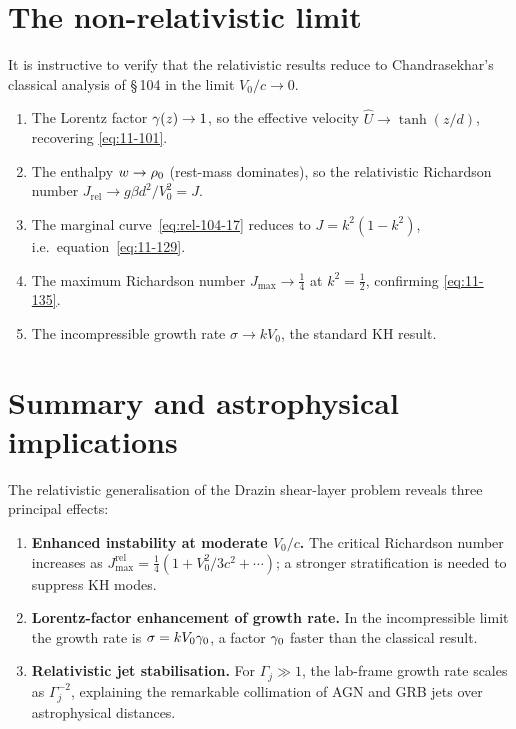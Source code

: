 \section{The non-relativistic limit}
\label{sec:rel-11-104-NR}

It is instructive to verify that the relativistic results reduce to
Chandrasekhar's classical analysis of \S\,104 in the limit $V_0/c\to 0$.
\begin{enumerate}
\item The Lorentz factor $\gamma(z)\to 1$, so the effective velocity
  $\hat{U}\to\tanh(z/d)$, recovering \eqref{eq:11-101}.
\item The enthalpy $w\to\rho_0$ (rest-mass dominates), so the
  relativistic Richardson number $J_{\mathrm{rel}}\to g\beta d^2/V_0^2 = J$.
\item The marginal curve~\eqref{eq:rel-104-17} reduces to
  $J=k^2(1-k^2)$, i.e.\ equation~\eqref{eq:11-129}.
\item The maximum Richardson number $J_{\max}\to\tfrac{1}{4}$ at
  $k^2=\tfrac{1}{2}$, confirming \eqref{eq:11-135}.
\item The incompressible growth rate $\sigma\to kV_0$, the standard KH
  result.
\end{enumerate}

\section{Summary and astrophysical implications}
\label{sec:rel-11-104-summary}

The relativistic generalisation of the Drazin shear-layer problem
reveals three principal effects:
\begin{enumerate}
\item \textbf{Enhanced instability at moderate $V_0/c$.}  The
  critical Richardson number increases as $J_{\max}^{\mathrm{rel}}
  =\tfrac{1}{4}(1+V_0^2/3c^2+\cdots)$; a stronger stratification is
  needed to suppress KH modes.
\item \textbf{Lorentz-factor enhancement of growth rate.}  In the
  incompressible limit the growth rate is $\sigma=kV_0\gamma_0$, a factor
  $\gamma_0$ faster than the classical result.
\item \textbf{Relativistic jet stabilisation.}  For $\Gamma_j\gg 1$,
  the lab-frame growth rate scales as $\Gamma_j^{-2}$, explaining the
  remarkable collimation of AGN and GRB jets over astrophysical
  distances.
\end{enumerate}

